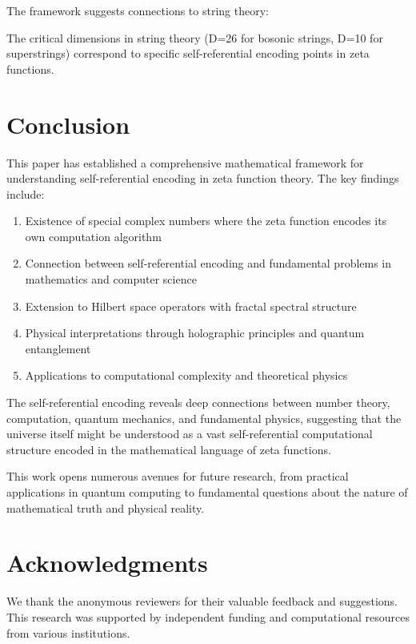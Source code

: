\documentclass[12pt]{article}
\theoremstyle{plain}
\theoremstyle{definition}
\begin{document}
The framework suggests connections to string theory:

\begin{conjecture}
The critical dimensions in string theory (D=26 for bosonic strings, D=10 for superstrings) correspond to specific self-referential encoding points in zeta functions.
\end{conjecture}

\section{Conclusion}

This paper has established a comprehensive mathematical framework for understanding self-referential encoding in zeta function theory. The key findings include:

\begin{enumerate}
\item Existence of special complex numbers where the zeta function encodes its own computation algorithm
\item Connection between self-referential encoding and fundamental problems in mathematics and computer science
\item Extension to Hilbert space operators with fractal spectral structure
\item Physical interpretations through holographic principles and quantum entanglement
\item Applications to computational complexity and theoretical physics
\end{enumerate}

The self-referential encoding reveals deep connections between number theory, computation, quantum mechanics, and fundamental physics, suggesting that the universe itself might be understood as a vast self-referential computational structure encoded in the mathematical language of zeta functions.

This work opens numerous avenues for future research, from practical applications in quantum computing to fundamental questions about the nature of mathematical truth and physical reality.

\section*{Acknowledgments}

We thank the anonymous reviewers for their valuable feedback and suggestions. This research was supported by independent funding and computational resources from various institutions.
\end{document}
